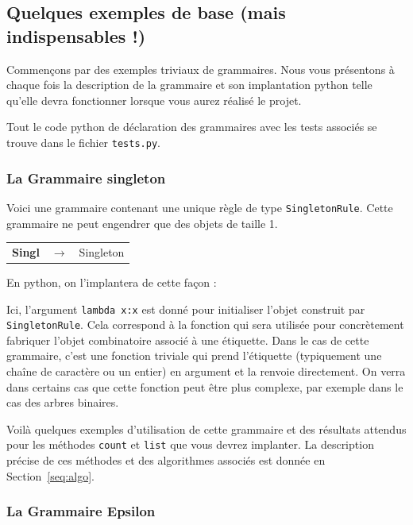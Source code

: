 \documentclass[11pt]{article}
\newcommand{\SingletonRule}{\texttt{SingletonRule}\xspace}
\newcommand{\cnt}{\texttt{count}\xspace}
\newcommand{\lst}{\texttt{list}\xspace}
\begin{document}
\subsection{Quelques exemples de base (mais indispensables !)}

Commençons par des exemples triviaux de grammaires. Nous vous présentons à
chaque fois la description de la grammaire et son implantation python telle
qu'elle devra fonctionner lorsque vous aurez réalisé le projet.

Tout le code python de déclaration des grammaires avec les tests associés se trouve
dans le fichier \texttt{tests.py}.

\subsubsection{La Grammaire singleton}

Voici une grammaire contenant une unique règle de type \SingletonRule. Cette
grammaire ne peut engendrer que des objets de taille 1.

\begin{tabular}{lll}
\textbf{Singl} & $\rightarrow$ & Singleton
\end{tabular}

En python, on l'implantera de cette façon :



Ici, l'argument \texttt{lambda x:x} est donné pour initialiser l'objet construit
par \SingletonRule.  Cela correspond à la fonction qui sera utilisée pour
concrètement fabriquer l'objet combinatoire associé à une étiquette. Dans le
cas de cette grammaire, c'est une fonction triviale qui prend l'étiquette
(typiquement une chaîne de caractère ou un entier) en argument et la renvoie
directement.  On verra dans certains cas que cette fonction peut être plus
complexe, par exemple dans le cas des arbres binaires.

Voilà quelques exemples d'utilisation de cette grammaire et des résultats
attendus pour les méthodes \cnt et \lst que vous devrez
implanter. La description précise de ces méthodes et des algorithmes associés
est donnée en Section~\ref{seq:algo}.



\subsubsection{La Grammaire Epsilon}
\end{document}
